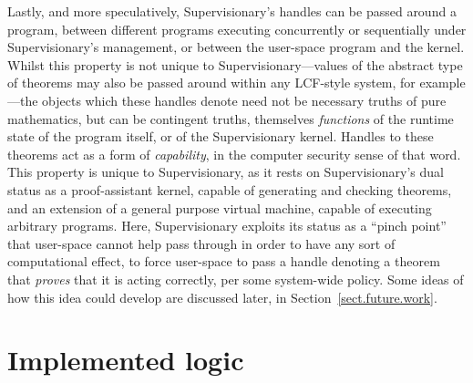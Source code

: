 \documentclass[a4paper, UKenglish, cleveref, autoref, thm-restate, colorlinks]{lipics-v2021}
\begin{document}
Lastly, and more speculatively, Supervisionary's handles can be passed around a program, between different programs executing concurrently or sequentially under Supervisionary's management, or between the user-space program and the kernel.
Whilst this property is not unique to Supervisionary---values of the abstract type of theorems may also be passed around within any LCF-style system, for example---the objects which these handles denote need not be necessary truths of pure mathematics, but can be contingent truths, themselves \emph{functions} of the runtime state of the program itself, or of the Supervisionary kernel.
Handles to these theorems act as a form of \emph{capability}, in the computer security sense of that word.
This property is unique to Supervisionary, as it rests on Supervisionary's dual status as a proof-assistant kernel, capable of generating and checking theorems, and an extension of a general purpose virtual machine, capable of executing arbitrary programs.
Here, Supervisionary exploits its status as a ``pinch point'' that user-space cannot help pass through in order to have any sort of computational effect, to force user-space to pass a handle denoting a theorem that \emph{proves} that it is acting correctly, per some system-wide policy.
Some ideas of how this idea could develop are discussed later, in Section~\ref{sect.future.work}.

\section{Implemented logic}
\label{sect.implemented.logic}
\end{document}
